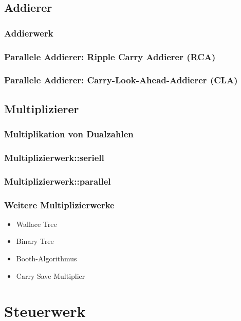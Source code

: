 \subsection{Addierer}
\subsubsection*{Addierwerk}
\subsubsection*{Parallele Addierer: Ripple Carry Addierer (RCA)}
\subsubsection*{Parallele Addierer: Carry-Look-Ahead-Addierer (CLA)}

\subsection{Multiplizierer}
\subsubsection{Multiplikation von Dualzahlen}

\subsubsection{Multiplizierwerk::seriell}
\subsubsection{Multiplizierwerk::parallel}

\subsubsection{Weitere Multiplizierwerke}
\begin{itemize}
\item Wallace Tree
\item Binary Tree
\item Booth-Algorithmus
\item Carry Save Multiplier
\end{itemize}

\section{Steuerwerk}

